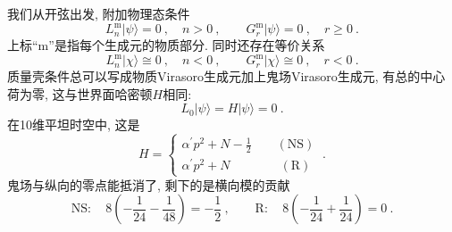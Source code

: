 我们从开弦出发, 附加物理态条件
\begin{equation}
    L_{n}^{\mathrm{m}}\lvert \psi \rangle=0 \:, \quad n >0 \:,\qquad
    G_{r}^{\mathrm{m}}\lvert\psi \rangle =0\:, \quad r\geq 0 \:. \label{10.5.1}
\end{equation}
上标``m''是指每个生成元的物质部分. 同时还存在等价关系
\begin{equation}
    L_{n}^{\mathrm{m}}\lvert \chi \rangle \cong 0 \:, \quad n<0 \:,\qquad
    G_{r}^{\mathrm{m}}\lvert\chi \rangle \cong 0\:, \quad r< 0 \:. \label{10.5.2}
\end{equation}
质量壳条件总可以写成物质Virasoro生成元加上鬼场Virasoro生成元, 有总的中心荷为零, 这与世界面哈密顿$ H $相同:
\begin{equation}
    L_{0}\lvert\psi\rangle = H\lvert\psi\rangle =0\:. \label{10.5.3}
\end{equation}
在10维平坦时空中, 这是
\begin{equation}
    H= \left\{
    \begin{array}{l}
         \alpha^{\prime}p^{2}+N-\frac{1}{2} \qquad (\text{NS})   \\
          \alpha^{\prime}p^{2}+N \qquad\qquad (\text{R})
    \end{array} \right. \:. \label{10.5.4}
\end{equation}
鬼场与纵向的零点能抵消了, 剩下的是横向模的贡献
\begin{equation}
    \text{NS}:\quad 8\left(-\frac{1}{24}-\frac{1}{48}\right) = -\frac{1}{2} \:, \qquad
    \text{R}: \quad 8\left(-\frac{1}{24}+\frac{1}{24}\right) = 0 \:. \label{10.5.5}
\end{equation}

